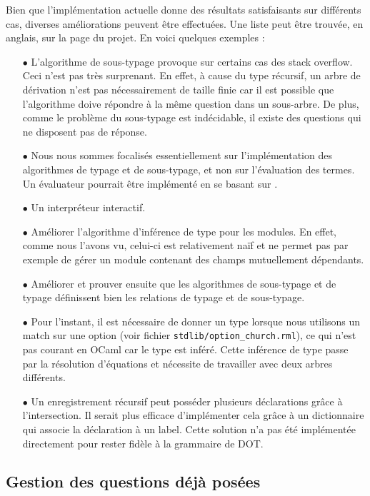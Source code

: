 Bien que l'implémentation actuelle donne des résultats satisfaisants sur
différents cas, diverses améliorations peuvent être effectuées. Une liste
peut être trouvée, en anglais, sur la page du
projet\cite{rml-github-issues}. En voici quelques exemples :

\begin{itemize}
  \item[$\bullet$] L'algorithme de sous-typage provoque sur certains cas des stack
    overflow. Ceci n'est pas très surprenant. En effet, à cause
    du type récursif, un arbre de dérivation n'est pas nécessairement de taille finie car
    il est possible que l'algorithme doive répondre à la même question dans un
    sous-arbre. De plus, comme le problème du sous-typage est indécidable, il
    existe des questions qui ne disposent pas de réponse.
  \item[$\bullet$] Nous nous sommes focalisés essentiellement sur l'implémentation des
    algorithmes de typage et de sous-typage, et non sur l'évaluation des termes.
    Un évaluateur pourrait être implémenté en se basant sur \cite{WF-DOT-2016}.
  \item[$\bullet$] Un interpréteur interactif.
  \item[$\bullet$] Améliorer l'algorithme d'inférence de type pour les modules. En effet,
      comme nous l'avons vu, celui-ci est relativement naïf et ne permet pas par
      exemple de gérer un module contenant des champs mutuellement dépendants.
  \item[$\bullet$] Améliorer et prouver ensuite que les algorithmes de sous-typage et de
      typage définissent bien les relations de typage et de sous-typage.
  \item[$\bullet$] Pour l'instant, il est nécessaire de donner un type lorsque nous
    utilisons un match sur une option (voir fichier \verb|stdlib/option_church.rml|), ce qui
    n'est pas courant en OCaml car le type est inféré. Cette inférence de type
    passe par la résolution d'équations et nécessite de travailler avec deux
    arbres différents.
  \item[$\bullet$] Un enregistrement récursif peut posséder plusieurs déclarations grâce à
    l'intersection. Il serait plus efficace d'implémenter cela grâce à un dictionnaire
    qui associe la déclaration à un label. Cette solution n'a pas été
    implémentée directement pour rester fidèle à la grammaire de DOT.
\end{itemize}


\subsection*{Gestion des questions déjà posées}

